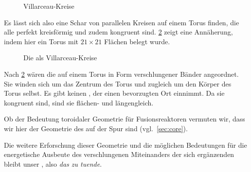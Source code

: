 \begin{figure}[ht!]
    \centering
    
    \caption{Villarceau-Kreise \cite{villarceauag2gaeh}}
    \label{fig:villarceaukreise}
\end{figure}

Es lässt sich also eine Schar von parallelen Kreisen auf einem Torus finden, die alle perfekt kreisförmig und zudem kongruent sind. \cref{fig:villarceautorous} zeigt eine Annäherung, indem hier ein Torus mit $21\times 21$ Flächen belegt wurde.

\begin{figure}[ht!]\label{fig:villarceautorous}
    \centering
                        
    \caption{Die  als Villarceau-Kreise}
    \label{fig:villarceautorous}
\end{figure}


Nach \cref{fig:villarceautorous} wären die  auf einem Torus in Form verschlungener Bänder angeordnet. Sie winden sich um das Zentrum des Torus und zugleich um den Körper des Torus selbst. 
Es gibt keinen , der einen bevorzugten Ort einnimmt. Da sie kongruent sind, sind sie flächen- und längengleich.

Ob der Bedeutung toroidaler Geometrie für Fusionsreaktoren vermuten wir, dass wir hier der Geometrie des  auf der Spur sind (vgl.~\cref{sec:core}). 

Die weitere Erforschung dieser Geometrie und die möglichen Bedeutungen für die energetische Ausbeute des verschlungenen Miteinanders der sich ergänzenden  bleibt unser , also \emph{das zu tuende}. 




    
